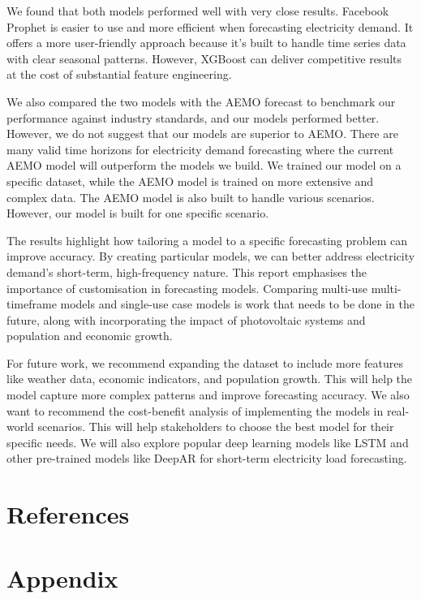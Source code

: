 \documentclass[mstat,12pt]{unswthesis}
\begin{document}
We found that both models performed well with very close results.
Facebook Prophet is easier to use and more efficient when forecasting
electricity demand. It offers a more user-friendly approach because it's
built to handle time series data with clear seasonal patterns. However,
XGBoost can deliver competitive results at the cost of substantial
feature engineering.

We also compared the two models with the AEMO forecast to benchmark our
performance against industry standards, and our models performed better.
However, we do not suggest that our models are superior to AEMO. There
are many valid time horizons for electricity demand forecasting where
the current AEMO model will outperform the models we build. We trained
our model on a specific dataset, while the AEMO model is trained on more
extensive and complex data. The AEMO model is also built to handle
various scenarios. However, our model is built for one specific
scenario.

The results highlight how tailoring a model to a specific forecasting
problem can improve accuracy. By creating particular models, we can
better address electricity demand's short-term, high-frequency nature.
This report emphasises the importance of customisation in forecasting
models. Comparing multi-use multi-timeframe models and single-use case
models is work that needs to be done in the future, along with
incorporating the impact of photovoltaic systems and population and
economic growth.

For future work, we recommend expanding the dataset to include more
features like weather data, economic indicators, and population growth.
This will help the model capture more complex patterns and improve
forecasting accuracy. We also want to recommend the cost-benefit
analysis of implementing the models in real-world scenarios. This will
help stakeholders to choose the best model for their specific needs. We
will also explore popular deep learning models like LSTM and other
pre-trained models like DeepAR for short-term electricity load
forecasting.

\hypertarget{references}{%
\chapter*{References}\label{references}}

 


\hypertarget{appendix}{%
\chapter*{Appendix}\label{appendix}}
\end{document}

